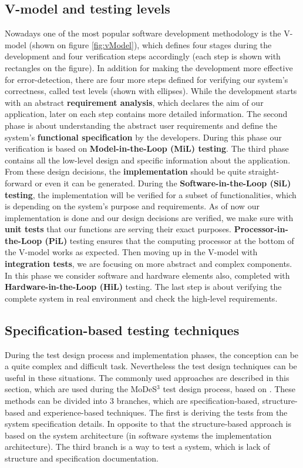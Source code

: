 \subsection{V-model and testing levels}
Nowadays one of the most popular software development methodology is the V-model \cite{Vmodel} (shown on figure \ref{fig:vModel}), which defines four stages during the development and four verification steps accordingly (each step is shown with rectangles on the figure). In addition for making the development more effective for error-detection, there are four more steps defined for verifying our system's correctness, called test levels \cite{TestLevels} (shown with ellipses). While the development starts with an abstract \textbf{requirement analysis}, which declares the aim of our application, later on each step contains more detailed information. The second phase is about understanding the abstract user requirements and define the system's \textbf{functional specification} by the developers. During this phase our verification is based on \textbf{Model-in-the-Loop (MiL) testing}. The third phase contains all the low-level design and specific information about the application. From these design decisions, the \textbf{implementation} should be quite straight-forward or even it can be generated. During the \textbf{Software-in-the-Loop (SiL) testing}, the implementation will be verified for a subset of functionalities, which is depending on the system's purpose and requirements.
As of now our implementation is done and our design decisions are verified, we make sure with \textbf{unit tests} that our functions are serving their exact purposes. \textbf{Processor-in-the-Loop (PiL)} testing ensures that the computing processor at the bottom of the V-model works as expected. Then moving up in the V-model with \textbf{integration tests}, we are focusing on more abstract and complex components. In this phase we consider software and hardware elements also, completed with \textbf{Hardware-in-the-Loop (HiL)} testing. The last step is about verifying the complete system in real environment and check the high-level requirements.

\subsection{Specification-based testing techniques}
During the test design process and implementation phases, the conception can be a quite complex and difficult task. Nevertheless the test design techniques can be useful in these situations. The commonly used approaches are described in this section, which are used during the MoDeS$^3$ test design process, based on \cite{IEEE13}. These methods can be divided into 3 branches, which are specification-based, structure-based and experience-based techniques. The first is deriving the tests from the system specification details. In opposite to that the structure-based approach is based on the system architecture (in software systems the implementation architecture). The third branch is a way to test a system, which is lack of structure and specification documentation. 

